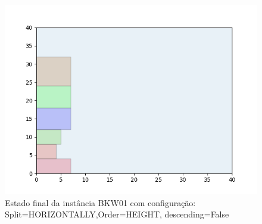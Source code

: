 \begin{figure}[H]
    \centering
    \caption[]{Estado final da instância BKW01 com configuração: Split=HORIZONTALLY,Order=HEIGHT, descending=False}
    \label{fig:bkw01-horizontally-height-false}
    \includegraphics[scale=0.5]{output/figures/bkw/bkw01/horizontally/height/false/00}
\end{figure}